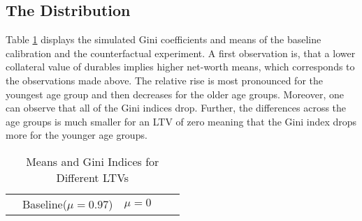 \documentclass[a4paper,12pt,legno]{article}
\begin{document}
\subsection{The Distribution}
Table \ref{ginis_means_LTV} displays the simulated Gini coefficients and means of the baseline calibration and the counterfactual experiment. A first observation is, that a lower collateral value of durables implies higher net-worth means, which corresponds to the observations made above. The relative rise is most pronounced for the youngest age group and then decreases for the older age groups. 
Moreover, one can observe that all of the Gini indices drop. Further, the differences across the age groups is much smaller for an LTV of zero meaning that the Gini index drops more for the younger age groups.


\begin{table}[!htbp]
\centering
\caption{Means and Gini Indices for Different LTVs}
\label{ginis_means_LTV}
\begin{tabular}{@{}lllll@{}}
\toprule
                                                                                 & Baseline($\mu = 0.97$) & $\mu = 0$
                                                                 

\end{tabular}
\end{table}
\end{document}
